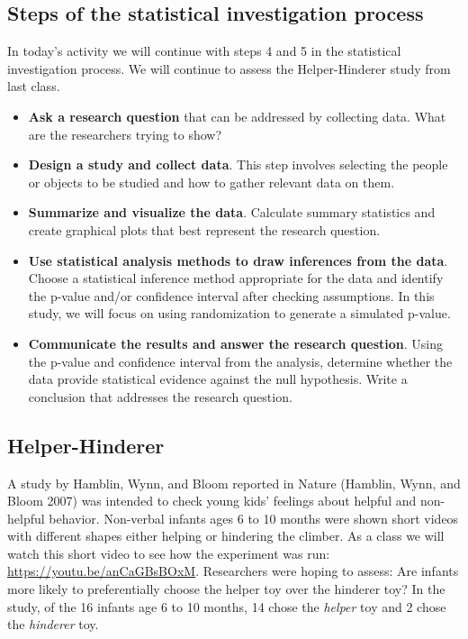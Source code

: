 \documentclass[
]{report}
\begin{document}
\hypertarget{steps-of-the-statistical-investigation-process-1}{%
\subsection{Steps of the statistical investigation process}\label{steps-of-the-statistical-investigation-process-1}}

In today's activity we will continue with steps 4 and 5 in the statistical investigation process. We will continue to assess the Helper-Hinderer study from last class.

\begin{itemize}
\item
  \textbf{Ask a research question} that can be addressed by collecting data. What are the researchers trying to show?
\item
  \textbf{Design a study and collect data}. This step involves selecting the people or objects to be studied and how to gather relevant data on them.
\item
  \textbf{Summarize and visualize the data}. Calculate summary statistics and create graphical plots that best represent the research question.
\item
  \textbf{Use statistical analysis methods to draw inferences from the data}. Choose a statistical inference method appropriate for the data and identify the p-value and/or confidence interval after checking assumptions. In this study, we will focus on using randomization to generate a simulated p-value.
\item
  \textbf{Communicate the results and answer the research question}. Using the p-value and confidence interval from the analysis, determine whether the data provide statistical evidence against the null hypothesis. Write a conclusion that addresses the research question.
\end{itemize}

\hypertarget{helper-hinderer-1}{%
\subsection{Helper-Hinderer}\label{helper-hinderer-1}}

A study by Hamblin, Wynn, and Bloom reported in Nature (Hamblin, Wynn, and Bloom 2007) was intended to check young kids' feelings about helpful and non-helpful behavior. Non-verbal infants ages 6 to 10 months were shown short videos with different shapes either helping or hindering the climber. As a class we will watch this short video to see how the experiment was run: \url{https://youtu.be/anCaGBsBOxM}. Researchers were hoping to assess: Are infants more likely to preferentially choose the helper toy over the hinderer toy? In the study, of the 16 infants age 6 to 10 months, 14 chose the \emph{helper} toy and 2 chose the \emph{hinderer} toy.
\end{document}
